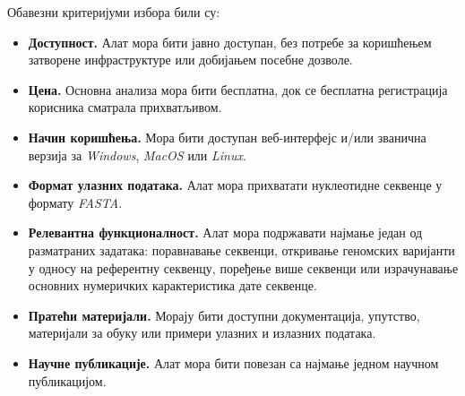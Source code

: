 \documentclass[12pt,oneside]{memoir}
\begin{document}
Обавезни критеријуми избора били су:
\begin{itemize}
    \item \textbf{Доступност.} Алат мора бити јавно доступан, без потребе за коришћењем затворене инфраструктуре или добијањем посебне дозволе.
    \item \textbf{Цена.} Основна анализа мора бити бесплатна, док се бесплатна регистрација корисника сматрала прихватљивом.
    \item \textbf{Начин коришћења.} Мора бити доступан веб-интерфејс и/или званична верзија за \textit{Windows}, \textit{MacOS} или \textit{Linux}.
    \item \textbf{Формат улазних података.} Алат мора прихватати нуклеотидне секвенце у формату \textit{FASTA}.
    \item \textbf{Релевантна функционалност.} Алат мора подржавати најмање један од разматраних задатака: поравнавање секвенци, откривање геномских варијанти у односу на референтну секвенцу, поређење више секвенци или израчунавање основних нумеричких карактеристика дате секвенце.
    \item \textbf{Пратећи материјали.} Морају бити доступни документација, упутство, материјали за обуку или примери улазних и излазних података.
    \item \textbf{Научне публикације.} Алат мора бити повезан са најмање једном научном публикацијом.
\end{itemize}
\end{document}
